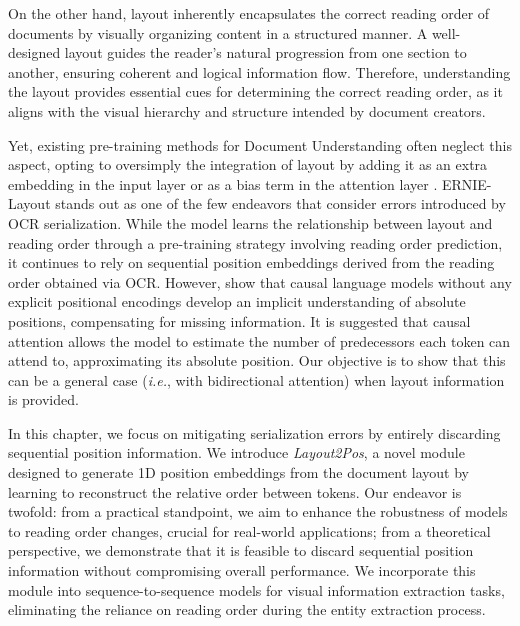 On the other hand, layout inherently encapsulates the correct reading order of documents by visually organizing content in a structured manner. A well-designed layout guides the reader's natural progression from one section to another, ensuring coherent and logical information flow. Therefore, understanding the layout provides essential cues for determining the correct reading order, as it aligns with the visual hierarchy and structure intended by document creators. 

Yet, existing pre-training methods for Document Understanding often neglect this aspect, opting to oversimply the integration of layout by adding it as an extra embedding in the input layer \citep{xu2020layoutlm} or as a bias term in the attention layer \citep{xu2020layoutlmv2}. ERNIE-Layout \citep{peng2022ernie} stands out as one of the few endeavors that consider errors introduced by OCR serialization. While the model learns the relationship between layout and reading order through a pre-training strategy involving reading order prediction, it continues to rely on sequential position embeddings derived from the reading order obtained via \ac{OCR}. However, \citet{haviv2022transformer} show that causal language models without any explicit positional encodings develop an implicit understanding of absolute positions, compensating for missing information. It is suggested that causal attention allows the model to estimate the number of predecessors each token can attend to, approximating its absolute position. Our objective is to show that this can be a general case (\textit{i.e.}, with bidirectional attention) when layout information is provided.

In this chapter, we focus on mitigating serialization errors by entirely discarding sequential position information. We introduce \textit{Layout2Pos}, a novel module designed to generate 1D position embeddings from the document layout by learning to reconstruct the relative order between tokens. Our endeavor is twofold: from a practical standpoint, we aim to enhance the robustness of models to reading order changes, crucial for real-world applications; from a theoretical perspective, we demonstrate that it is feasible to discard sequential position information without compromising overall performance. We incorporate this module into sequence-to-sequence models for visual information extraction tasks, eliminating the reliance on reading order during the entity extraction process.


